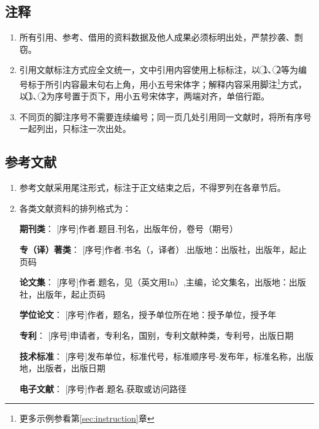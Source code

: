 \subsection{注释}

\begin{enumerate}[label=\arabic*)]
	\item 所有引用、参考、借用的资料数据及他人成果必须标明出处，严禁抄袭、剽窃。
	
	\item 引用文献标注方式应全文统一，文中引用内容使用上标标注，以 \textcircled{1}、\textcircled{2}等为编号标于所引内容最末句右上角，用小五号宋体字；解释内容采用脚注\footnote{更多示例参看第\ref{sec:instruction}章}方式，以\textcircled{1}、\textcircled{2}为序号置于页下，用小五号宋体字，两端对齐，单倍行距。
	
	\item 不同页的脚注序号不需要连续编号；同一页几处引用同一文献时，将所有序号一起列出，只标注一次出处。
	
\end{enumerate}

\subsection{参考文献}

\begin{enumerate}[label=\arabic*)]
	\item 参考文献采用尾注形式，标注于正文结束之后，不得罗列在各章节后。
	
	\item 各类文献资料的排列格式为：
	
	{\bfseries 期刊类}：
	[序号]作者.题目.刊名，出版年份，卷号（期号）
	
	{\bfseries 专（译）著类}：
	[序号]作者.书名（，译者）.出版地：出版社，出版年，起止页码
	
	{\bfseries 论文集}：
	[序号]作者.题名，见（英文用In）,主编，论文集名，出版地：出版社，出版年，起止页码
	
	{\bfseries 学位论文}：
	[序号]作者，题名，授予单位所在地：授予单位，授予年
	
	{\bfseries 专利}：
	[序号]申请者，专利名，国别，专利文献种类，专利号，出版日期
	
	{\bfseries 技术标准}：
	[序号]发布单位，标准代号，标准顺序号-发布年，标准名称，出版地，出版者，出版日期
	
	{\bfseries 电子文献}：
	[序号]作者.题名.获取或访问路径
	
\end{enumerate}


